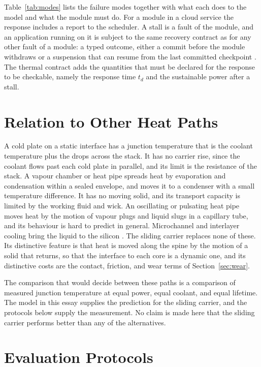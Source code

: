\documentclass[11pt]{article}
\theoremstyle{definition}
\theoremstyle{plain}
\theoremstyle{remark}
\begin{document}
Table~\ref{tab:modes} lists the failure modes together with what each does to the model and what the module must do. For a module in a cloud service the response includes a report to the scheduler. A stall is a fault of the module, and an application running on it is subject to the same recovery contract as for any other fault of a module: a typed outcome, either a commit before the module withdraws or a suspension that can resume from the last committed checkpoint \cite{flyxion-gpu}. The thermal contract adds the quantities that must be declared for the response to be checkable, namely the response time $t_d$ and the sustainable power after a stall.

\section{Relation to Other Heat Paths}
\label{sec:related}

A cold plate on a static interface has a junction temperature that is the coolant temperature plus the drops across the stack. It has no carrier rise, since the coolant flows past each cold plate in parallel, and its limit is the resistance of the stack. A vapour chamber or heat pipe spreads heat by evaporation and condensation within a sealed envelope, and moves it to a condenser with a small temperature difference. It has no moving solid, and its transport capacity is limited by the working fluid and wick. An oscillating or pulsating heat pipe moves heat by the motion of vapour plugs and liquid slugs in a capillary tube, and its behaviour is hard to predict in general. Microchannel and interlayer cooling bring the liquid to the silicon \cite{tuckerman,brunschwiler}. The sliding carrier replaces none of these. Its distinctive feature is that heat is moved along the spine by the motion of a solid that returns, so that the interface to each core is a dynamic one, and its distinctive costs are the contact, friction, and wear terms of Section~\ref{sec:wear}.

The comparison that would decide between these paths is a comparison of measured junction temperature at equal power, equal coolant, and equal lifetime. The model in this essay supplies the prediction for the sliding carrier, and the protocols below supply the measurement. No claim is made here that the sliding carrier performs better than any of the alternatives.

\section{Evaluation Protocols}
\label{sec:protocols}
\end{document}
